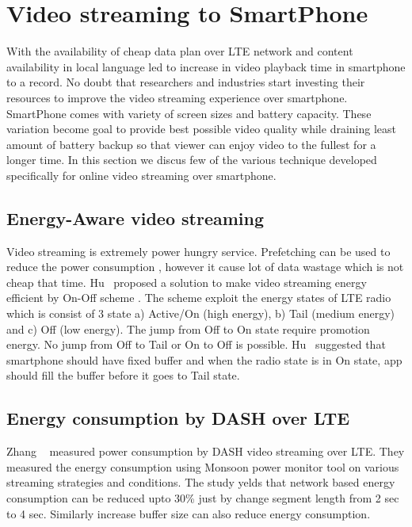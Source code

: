 \section{Video streaming to SmartPhone}
With the availability of cheap data plan over LTE network and content availability in local language led to increase in video playback time in smartphone to a record. No doubt that researchers and industries start investing their resources to improve the video streaming experience over smartphone. SmartPhone comes with variety of screen sizes and battery capacity. These variation become goal to provide best possible video quality while draining least amount of battery backup so that viewer can enjoy video to the fullest for a longer time. In this section we discus few of the various technique developed specifically for online video streaming over smartphone.

\subsection{Energy-Aware video streaming}
Video streaming is extremely power hungry service. Prefetching can be used to reduce the power consumption \cite{6681586,10.1145/2079296.2079321}, however it cause lot of data wastage which is not cheap that time. Hu \etal\ proposed a solution to make video streaming energy efficient by On-Off scheme \cite{7218493}. The scheme exploit the energy states of LTE radio which is consist of 3 state a) Active/On (high energy), b) Tail (medium energy) and c) Off (low energy). The jump from Off to On state require promotion energy. No jump from Off to Tail or On to Off is possible. Hu \etal\ suggested that smartphone should have fixed buffer and when the radio state is in On state, app should fill the buffer before it goes to Tail state.

\subsection{Energy consumption by DASH over LTE}
Zhang \etal\ \cite{10.1145/2910018.2910656} measured power consumption by DASH video streaming over LTE. They measured the energy consumption using Monsoon power monitor \cite{monsoonmonitor} tool on various streaming strategies and conditions. The study yelds that network based energy consumption can be reduced upto 30\% just by change segment length from 2 sec to 4 sec. Similarly increase buffer size can also reduce energy consumption.

